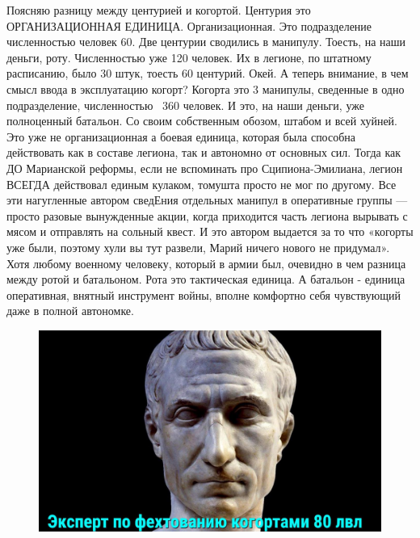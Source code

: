 Поясняю разницу между центурией и когортой. Центурия это ОРГАНИЗАЦИОННАЯ ЕДИНИЦА. Организационная. Это подразделение численностью человек 60. Две центурии сводились в манипулу. Тоесть, на наши деньги, роту. Численностью уже 120 человек. Их в легионе, по штатному расписанию, было 30 штук, тоесть 60 центурий. Окей. А теперь внимание, в чем смысл ввода в эксплуатацию когорт? Когорта это 3 манипулы, сведенные в одно подразделение, численностью ~360 человек. И это, на наши деньги, уже полноценный батальон. Со своим собственным обозом, штабом и всей хуйней. Это уже не организационная а боевая единица, которая была способна действовать как в составе легиона, так и автономно от основных сил. Тогда как ДО Марианской реформы, если не вспоминать про Сципиона-Эмилиана, легион ВСЕГДА действовал единым кулаком, томушта просто не мог по другому. Все эти нагугленные автором сведЕния отдельных манипул в оперативные группы — просто разовые вынужденные акции, когда приходится часть легиона вырывать с мясом и отправлять на сольный квест. И это автором выдается за то что «когорты уже были, поэтому хули вы тут развели, Марий ничего нового не придумал». Хотя любому военному человеку, который в армии был, очевидно в чем разница между ротой и батальоном. Рота это тактическая единица. А батальон - единица оперативная, внятный инструмент войны, вполне комфортно себя чувствующий даже в полной автономке.

\begin{figure}[h!tb]
	\centering\includegraphics[scale=0.35]{Mariy/1601699074162111731.png}
\end{figure}

